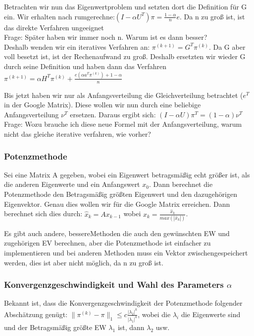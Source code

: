 \documentclass[]{article}
\begin{document}
Betrachten wir nun das Eigenwertproblem und setzten dort die Definition für G ein. Wir erhalten nach rumgerechne:$(I- \alpha U^T) \pi = \frac{1 - \alpha}{n}e$. Da n zu groß ist, ist das direkte Verfahren ungeeignet \\

Frage: Später haben wir immer noch n. Warum ist es dann besser? \\

Deshalb wenden wir ein iteratives Verfahren an: $\pi^{(k+1)} = G^T \pi^{(k)}$. Da G aber voll besetzt ist, ist der Rechenaufwand zu groß. Deshalb ersetzten wir wieder G durch seine Definition und haben dann das Verfahren $\pi^{(k+1)}=\alpha H^T \pi^{(k)} + \frac{e(\alpha a^T \pi^{(k)}) + 1 - \alpha}{n}$ 

Bis jetzt haben wir nur als Anfangsverteilung die Gleichverteilung betrachtet ($e^T$ in der Google Matrix). Diese wollen wir nun durch eine beliebige Anfangsverteilung $\nu^T$ ersetzen. Daraus ergibt sich: $(I- \alpha U) \pi^T = (1-\alpha)\nu^T$ \\

Frage: Wozu brauche ich diese neue Formel mit der Anfangsverteilung, warum nicht das gleiche iterative verfahren, wie vorher? 

\subsubsection*{Potenzmethode} 

Sei eine Matrix A gegeben, wobei ein Eigenwert betragsmäßig echt größer ist, als die anderen Eigenwerte und ein Anfangswert $x_0$. Dann berechnet die Potenzmethode den Betragsmäßig größten Eigenwert und den dazugehörigen Eigenvektor. Genau dies wollen wir für die Google Matrix erreichen. Dann berechnet sich dies durch: $\hat{x}_k=A x_{k-1}$ wobei $x_k = \frac{\hat{x}_k}{max(|\hat{x}_k|)}$.

Es gibt auch andere, \glqq bessere\grqq Methoden die auch den gewünschten EW und zugehörigen EV berechnen, aber die Potenzmethode ist einfacher zu implementieren und bei anderen Methoden muss ein Vektor zwischengespeichert werden, dies ist aber nicht möglich, da n zu groß ist. 

\subsubsection{Konvergenzgeschwindigkeit und Wahl des Parameters $\alpha$} 

Bekannt ist, dass die Konvergenzgeschwindigkeit der Potenzmethode folgender Abschätzung genügt: $\| \pi^{(k)} - \pi\|_1 \le c \frac{|\lambda_2|^k}{|\lambda_1|^k}$, wobei die $\lambda_i$ die Eigenwerte sind und der Betragsmäßig größte EW $\lambda_1$ ist, dann $\lambda_2$ usw.   
\end{document}
